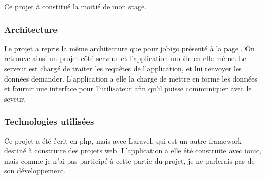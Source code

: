 \documentclass[../rapport.tex]{subfiles}
\begin{document}
        Ce projet à constitué la moitié de mon stage.

        \subsubsection{Architecture}
        Le projet a repris la même architecture que pour jobigo présenté à la page \pageref{subsec:jobigo}. On retrouve ainsi un projet côté serveur et l'application mobile en elle même. Le serveur est chargé de traiter les requêtes de l'application, et lui renvoyer les données demander. L'application a elle la charge de mettre en forme les données et fournir nue interface pour l'utilisateur afin qu'il puisse communiquer avec le seveur.

        \subsubsection{Technologies utilisées}
        Ce projet a été écrit en php, mais avec Laravel, qui est un autre \gls{framework} destiné à construire des projets web.
        L'application a elle été construite avec ionic, mais comme je n'ai pas participé à cette partie du projet, je ne parlerais pas de son développement.
\end{document}
